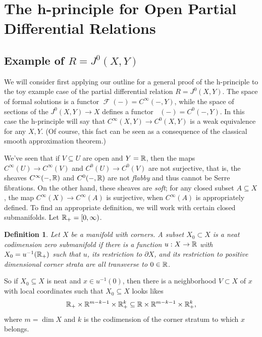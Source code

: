\documentclass{article}
\newtheorem{definition}[theorem]{Definition}
\newtheorem{proposed work}[theorem]{Proposed Work}
\DeclareMathOperator{\CF}{\mathcal F}
\DeclareMathOperator{\CFh}{\mathcal{F}^{h}} %
\begin{document}
%
%

\section{The h-principle for Open Partial Differential Relations}


\subsection{Example of $R = J^0(X,Y)$}

We will consider first applying our outline for a general proof of the
h-principle to the toy example case of the partial differential
relation $R = J^0(X,Y)$. The space of formal solutions is a functor
$\CF(-) = C^\infty(- , Y)$, while the space of sections of the
$J^0(X,Y)\to X$ defines a functor $\CFh(-) = C^0(-,Y)$. In this case
the h-principle will say that $C^\infty(X,Y) \to C^0(X,Y)$ is a
weak equivalence for any $X,Y$. %
(Of course, this fact can be seen as a consequence of the classical smooth
approximation theorem.)

We've seen that if $V\subseteq U$ are open and $Y=\mathbb R$, then the maps
$C^\infty(U)\to C^\infty(V)$ and $C^0(U)\to C^0(V)$ are not
surjective, that is, the sheaves $C^\infty(-,\mathbb R)$ and $C^0(-, \mathbb R)$ are
not {\em flabby} and thus cannot be Serre fibrations. On the other
hand, these sheaves are {\em soft}; for any closed subset
$A\subseteq X$, the map $C^\infty(X) \to C^\infty(A)$ is surjective,
when $C^\infty(A)$ is appropriately defined. To find an appropriate
definition, we will work with certain closed submanifolds. Let $\mathbb R_+ =
[0,\infty)$. 

\begin{definition} \label{def:neat} Let $X$ be a manifold with
  corners. A subset $X_0\subset X$ is a {\em neat codimension zero
    submanifold} if there is a function $u: X\to \mathbb R$ with
  $X_0 = u^{-1}(\mathbb R_+)$ such that $u$, its restriction to $\partial X$,
  and its restriction to positive dimensional corner strata are all
  transverse to $0\in \mathbb R$.
\end{definition}

So if $X_0\subseteq X$ is neat and $x\in u^{-1}(0)$, then there is a
neighborhood $V\subset X$ of $x$ with local coordinates such that
$X_0 \subseteq X$ looks likes
\[\mathbb R_+ \times \mathbb R^{m-k-1}\times \mathbb R_+^k \subseteq \mathbb R\times
  \mathbb R^{m-k-1}\times \mathbb R_+^k,\] where $m = \dim X$ and $k$ is the
codimension of the corner stratum to which $x$ belongs.
\end{document}
